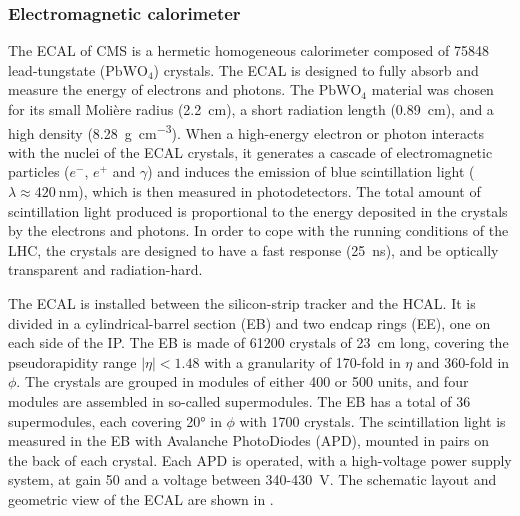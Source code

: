 \subsubsection{Electromagnetic calorimeter}\label{sec:Experiment_CMS_Subdetectors_ECAL}

The ECAL of CMS is a hermetic homogeneous calorimeter composed of 75848 lead-tungstate ($\text{PbWO}_{4}$) crystals. The ECAL is designed to fully absorb and measure the energy of electrons and photons. The $\text{PbWO}_{4}$ material was chosen for its small Moli{\`e}re radius (\SI{2.2}{\cm}), a short radiation length (\SI{0.89}{\cm}), and a high density (\SI{8.28}{\gram\per\cm\cubed}). When a high-energy electron or photon interacts with the nuclei of the ECAL crystals, it generates a cascade of electromagnetic particles ($e^{-}$, $e^{+}$ and $\gamma$) and induces the emission of blue scintillation light ($\lambda\approx\SI{420}{\nm}$), which is then measured in photodetectors. The total amount of scintillation light produced is proportional to the energy deposited in the crystals by the electrons and photons. In order to cope with the running conditions of the LHC, the crystals are designed to have a fast response (\SI{25}{\ns}), and be optically transparent and radiation-hard.

The ECAL is installed between the silicon-strip tracker and the HCAL. It is divided in a cylindrical-barrel section (EB) and two endcap rings (EE), one on each side of the IP. The EB is made of 61200 crystals of \SI{23}{\cm} long, covering the pseudorapidity range $|\eta|<1.48$ with a granularity of 170-fold in $\eta$ and 360-fold in $\phi$. The crystals are grouped in modules of either 400 or 500 units, and four modules are assembled in so-called supermodules. The EB has a total of 36 supermodules, each covering \ang{20} in $\phi$ with 1700 crystals. The scintillation light is measured in the EB with Avalanche PhotoDiodes (APD), mounted in pairs on the back of each crystal. Each APD is operated, with a high-voltage power supply system, at gain 50 and a voltage between 340-\SI{430}{\V}. The schematic layout and geometric view of the ECAL are shown in .

